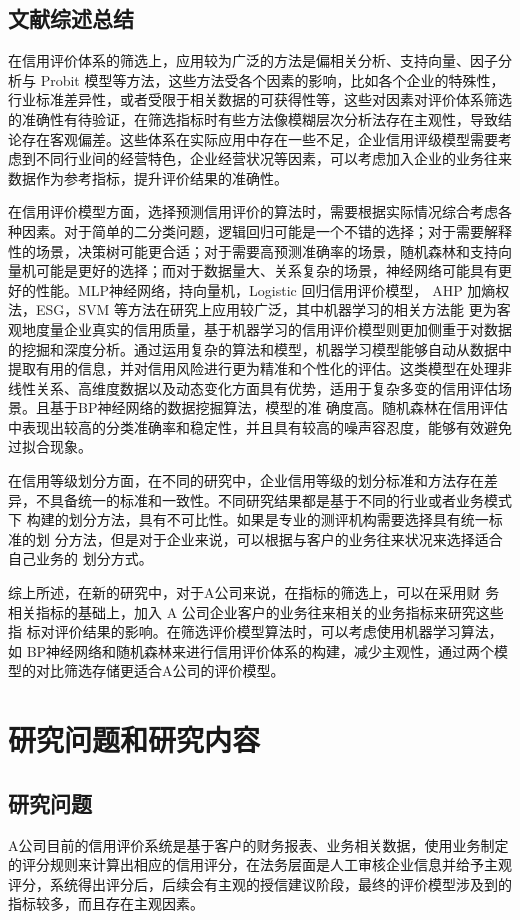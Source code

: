 \subsection{文献综述总结}
在信用评价体系的筛选上，应用较为广泛的方法是偏相关分析、支持向量、因子分析与 Probit 模型等方法，这些方法受各个因素的影响，比如各个企业的特殊性，行业标准差异性，或者受限于相关数据的可获得性等，这些对因素对评价体系筛选的准确性有待验证，在筛选指标时有些方法像模糊层次分析法存在主观性，导致结论存在客观偏差。这些体系在实际应用中存在一些不足，企业信用评级模型需要考虑到不同行业间的经营特色，企业经营状况等因素，可以考虑加入企业的业务往来数据作为参考指标，提升评价结果的准确性。



在信用评价模型方面，选择预测信用评价的算法时，需要根据实际情况综合考虑各种因素。对于简单的二分类问题，逻辑回归可能是一个不错的选择；对于需要解释性的场景，决策树可能更合适；对于需要高预测准确率的场景，随机森林和支持向量机可能是更好的选择；而对于数据量大、关系复杂的场景，神经网络可能具有更好的性能。MLP神经网络，持向量机，Logistic 回归信用评价模型，
AHP 加熵权法，ESG，SVM 等方法在研究上应用较广泛，其中机器学习的相关方法能
更为客观地度量企业真实的信用质量，基于机器学习的信用评价模型则更加侧重于对数据的挖掘和深度分析。通过运用复杂的算法和模型，机器学习模型能够自动从数据中提取有用的信息，并对信用风险进行更为精准和个性化的评估。这类模型在处理非线性关系、高维度数据以及动态变化方面具有优势，适用于复杂多变的信用评估场景。且基于BP神经网络的数据挖掘算法，模型的准
确度高。随机森林在信用评估中表现出较高的分类准确率和稳定性，并且具有较高的噪声容忍度，能够有效避免过拟合现象。

在信用等级划分方面，在不同的研究中，企业信用等级的划分标准和方法存在差
异，不具备统一的标准和一致性。不同研究结果都是基于不同的行业或者业务模式下
构建的划分方法，具有不可比性。如果是专业的测评机构需要选择具有统一标准的划
分方法，但是对于企业来说，可以根据与客户的业务往来状况来选择适合自己业务的
划分方式。

综上所述，在新的研究中，对于A公司来说，在指标的筛选上，可以在采用财
务相关指标的基础上，加入 A 公司企业客户的业务往来相关的业务指标来研究这些指
标对评价结果的影响。在筛选评价模型算法时，可以考虑使用机器学习算法，如 BP神经网络和随机森林来进行信用评价体系的构建，减少主观性，通过两个模型的对比筛选存储更适合A公司的评价模型。

\section{研究问题和研究内容}
\subsection{研究问题}
A公司目前的信用评价系统是基于客户的财务报表、业务相关数据，使用业务制定的评分规则来计算出相应的信用评分，在法务层面是人工审核企业信息并给予主观评分，系统得出评分后，后续会有主观的授信建议阶段，最终的评价模型涉及到的指标较多，而且存在主观因素。

